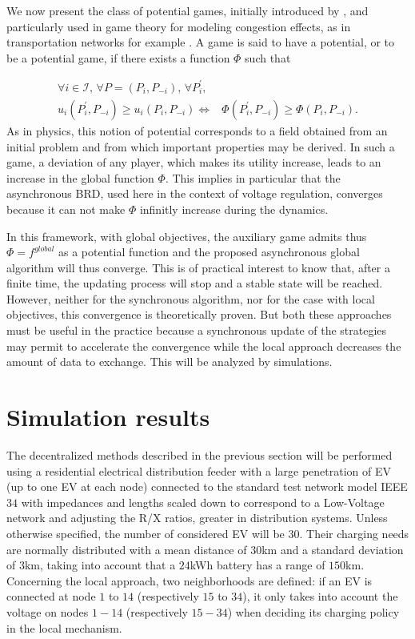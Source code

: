 \documentclass[journal]{IEEEtran}
\begin{document}
We now present the class of potential games, initially introduced by \cite{Monderer1996}, and particularly used in game theory for modeling congestion effects, as in transportation networks for example \cite{Wardrop1952}. A game is said to have a potential, or to be a potential game, if there exists a function $\Phi$ such that 

\begin{eqnarray}
\label{GameOrdPotential}
\forall i \in \mathcal{I}, \, \forall P=(P_{i},P_{-i}), \, \forall P_{i}^{\prime}, & \\
u_{i}(P_{i}^{\prime},P_{-i}) \geq u_{i}(P_{i},P_{-i}) \Leftrightarrow & \Phi(P_{i}^{\prime},P_{-i}) \geq \Phi(P_{i},P_{-i}) \textrm{.} \nonumber
\end{eqnarray}
As in physics, this notion of potential corresponds to a field obtained from an initial problem and from which important properties may be derived. In such a game, a deviation of any player, which makes its utility increase, leads to an increase in the global function $\Phi$. This implies in particular that the asynchronous BRD, used here in the context of voltage regulation, converges because it can not make $\Phi$ infinitly increase during the dynamics.

In this framework, with global objectives, the auxiliary game admits thus $\Phi=f^{global}$ as a potential function and the proposed asynchronous global algorithm will thus converge. This is of practical interest to know that, after a finite time, the updating process will stop and a stable state will be reached. However, neither for the synchronous algorithm, nor for the case with local objectives, this convergence is theoretically proven. But both these approaches must be useful in the practice because a synchronous update of the strategies may permit to accelerate the convergence while the local approach decreases the amount of data to exchange. This will be analyzed by simulations.

\section{Simulation results}


The decentralized methods described in the previous section will be performed using a residential electrical distribution feeder with a large penetration of EV (up to one EV at each node) connected to the standard test network model IEEE $34$ with impedances and lengths scaled down to correspond to a Low-Voltage network and adjusting the R/X ratios, greater in distribution systems. Unless otherwise specified, the number of considered EV will be $30$. Their charging needs are normally distributed with a mean distance of $30$km and a standard deviation of $3$km, taking into account that a $24$kWh battery has a range of $150$km. Concerning the local approach, two neighborhoods are defined: if an EV is connected at node $1$ to $14$ (respectively $15$ to $34$), it only takes into account the voltage on nodes $1-14$ (respectively $15-34$) when deciding its charging policy in the local mechanism. 
\end{document}
